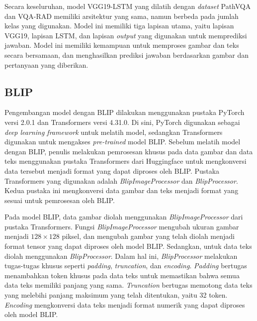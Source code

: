 \par Secara keseluruhan, model VGG19-LSTM yang dilatih dengan \textit{dataset} PathVQA dan VQA-RAD memiliki arsitektur yang sama, namun berbeda pada jumlah kelas yang digunakan. Model ini memiliki tiga lapisan utama, yaitu lapisan VGG19, lapisan LSTM, dan lapisan \textit{output} yang digunakan untuk memprediksi jawaban. Model ini memiliki kemampuan untuk memproses gambar dan teks secara bersamaan, dan menghasilkan prediksi jawaban berdasarkan gambar dan pertanyaan yang diberikan.

\subsection{BLIP}

\par Pengembangan model dengan BLIP dilakukan menggunakan pustaka PyTorch versi 2.0.1 dan Transformers versi 4.31.0. Di sini, PyTorch digunakan sebagai \textit{deep learning framework} untuk melatih model, sedangkan Transformers digunakan untuk mengakses \textit{pre-trained} model BLIP. Sebelum melatih model dengan BLIP, penulis melakukan pemrosesan khusus pada data gambar dan data teks menggunakan pustaka Transformers dari Huggingface untuk mengkonversi data tersebut menjadi format yang dapat diproses oleh BLIP. Pustaka Transformers yang digunakan adalah \textit{BlipImageProcessor} dan \textit{BlipProcessor}. Kedua pustaka ini mengkonversi data gambar dan teks menjadi format yang sesuai untuk pemrosesan oleh BLIP.


\par Pada model BLIP, data gambar diolah menggunakan \textit{BlipImageProcessor} dari pustaka Transformers. Fungsi \textit{BlipImageProcessor} mengubah ukuran gambar menjadi $128 \times 128$ piksel, dan mengubah gambar yang telah diolah menjadi format tensor yang dapat diproses oleh model BLIP. Sedangkan, untuk data teks diolah menggunakan \textit{BlipProcessor}. Dalam hal ini, \textit{BlipProcessor} melakukan tugas-tugas khusus seperti \textit{padding}, \textit{truncation}, dan \textit{encoding}. \textit{Padding} bertugas menambahkan token khusus pada data teks untuk memastikan bahwa semua data teks memiliki panjang yang sama. \textit{Truncation} bertugas memotong data teks yang melebihi panjang maksimum yang telah ditentukan, yaitu 32 token. \textit{Encoding} mengkonversi data teks menjadi format numerik yang dapat diproses oleh model BLIP.

